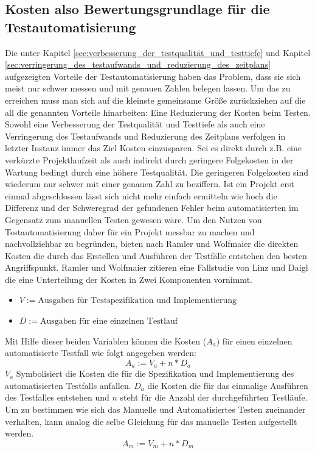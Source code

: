 \subsection{Kosten also Bewertungsgrundlage für die Testautomatisierung}
\label{sec:kosten_der_testautomatisierung}
Die unter Kapitel \ref{sec:verbesserung_der_testqualität_und_testtiefe} und Kapitel \ref{sec:verringerung_des_testaufwands_und_reduzierung_des_zeitplans} aufgezeigten Vorteile der Testautomatisierung haben das Problem, dass sie sich meist nur schwer messen und mit genauen Zahlen belegen lassen.
Um das zu erreichen muss man sich auf die kleinste gemeinsame Größe zurückziehen auf die all die genannten Vorteile hinarbeiten: Eine Reduzierung der Kosten beim Testen.
Sowohl eine Verbesserung der Testqualität und Testtiefe als auch eine Verringerung des Testaufwands und Reduzierung des Zeitplans verfolgen in letzter Instanz immer das Ziel Kosten einzusparen. Sei es direkt durch z.B. eine verkürzte Projektlaufzeit als auch indirekt durch geringere Folgekosten in der Wartung bedingt durch eine höhere Testqualität.
Die geringeren Folgekosten sind wiederum nur schwer mit einer genauen Zahl zu beziffern. Ist ein Projekt erst einmal abgeschlossen lässt sich nicht mehr einfach ermitteln wie hoch die Differenz und der Schweregrad der gefundenen Fehler beim automatisierten im Gegensatz zum manuellen Testen gewesen wäre.
Um den Nutzen von Testautomatisierung daher für ein Projekt messbar zu machen und nachvollziehbar zu begründen, bieten nach Ramler und Wolfmaier \cite{ramler_economic_2006} die direkten Kosten die durch das Erstellen und Ausführen der Testfälle entstehen den besten Angriffspunkt. 
Ramler und Wolfmaier \cite{ramler_economic_2006} zitieren eine Fallstudie von Linz und Daigl \cite{dustin_automated_1999} die eine Unterteilung der Kosten in Zwei Komponenten vornimmt.
\begin{itemize}
    \item[] \(V:=\text{Ausgaben für Testspezifikation und Implementierung}\)
    \item[] \(D:=\text{Ausgaben für eine einzelnen Testlauf}\)
\end{itemize}

Mit Hilfe dieser beiden Variablen können die Kosten (\(A_a\)) für einen einzelnen automatisierte Testfall wie folgt angegeben werden:
\begin{equation}
A_a:=V_a+n*D_a
\end{equation}
\(V_a\) Symbolisiert die Kosten die für die Spezifikation und Implementierung des automatisierten Testfalls anfallen. \(D_a\) die Kosten die für das einmalige Ausführen des Testfalles entstehen und \(n\) steht für die Anzahl der durchgeführten Testläufe.
Um zu bestimmen wie sich das Manuelle und Automatisiertes Testen zueinander verhalten, kann analog die selbe Gleichung für das manuelle Testen aufgestellt werden.
\begin{equation}
A_m:=V_m+n*D_m
\end{equation}

